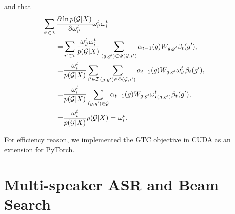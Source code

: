 \documentclass{article}
\begin{document}
and that
\begin{align}
    &  \hspace{-1cm}\sum_{i' \in \mathcal{I}} \frac{\partial \ln{{p}(\mathcal{G}|X)}}{\partial \omega_{i'}^t} \omega_{i'}^t \omega_{i}^t \nonumber  \nonumber \\
    =& \sum_{i' \in \mathcal{I}} \frac{\omega_{i'}^t \omega_{i}^t}{{p}(\mathcal{G}|X)} \sum_{(g,g') \in \operatorname{\Phi}(\mathcal{G},i')} \alpha_{t-1}(g) W_{g,g'} \beta_t(g') ,  \nonumber \\
    =&  \frac{ \omega_{i}^t}{{p}(\mathcal{G}|X)} \sum_{i' \in \mathcal{I}} \sum_{(g,g') \in \operatorname{\Phi}(\mathcal{G},i')} \alpha_{t-1}(g) W_{g,g'} \omega_{i'}^t \beta_t(g') ,  \nonumber \\
    =&  \frac{ \omega_{i}^t}{{p}(\mathcal{G}|X)} \sum_{(g,g') \in \mathcal{G}} \alpha_{t-1}(g) W_{g,g'} \omega_{I(g,g')}^t \beta_t(g') ,  \nonumber \\
    =& \frac{\omega_{i}^t}{{p}(\mathcal{G}|X)} {p}(\mathcal{G}|X) = \omega_i^t.
\end{align}

For efficiency reason, we implemented the GTC objective in CUDA as an extension for PyTorch.

\section{Multi-speaker ASR and Beam Search}
\label{sec:beamsearch}
\end{document}
